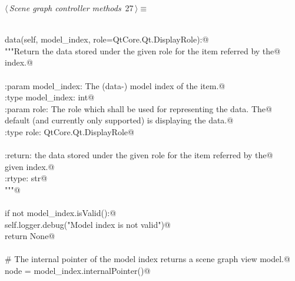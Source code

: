 \documentclass[
    a4paper,      %
    10pt,         %
    openright,    %
    notitlepage,  %
    parskip=half, %
]{scrreprt}       %
\theoremstyle{definition}                    %
\begin{document}
\begin{flushleft} \small
\begin{minipage}{\linewidth}\label{scrap26}\raggedright\small
{} $\langle\,${\itshape Scene graph controller methods}\nobreak\ {\footnotesize {27}}$\,\rangle\equiv$
\vspace{-1exm}
\begin{list}{}{} \item
\mbox{}\lstinline@@\\
\mbox{}\lstinline@def data(self, model_index, role=QtCore.Qt.DisplayRole):@\\
\mbox{}\lstinline@    """Return the data stored under the given role for the item referred by the@\\
\mbox{}\lstinline@    index.@\\
\mbox{}\lstinline@@\\
\mbox{}\lstinline@    :param model_index: The (data-) model index of the item.@\\
\mbox{}\lstinline@    :type model_index: int@\\
\mbox{}\lstinline@    :param role: The role which shall be used for representing the data. The@\\
\mbox{}\lstinline@                 default (and currently only supported) is displaying the data.@\\
\mbox{}\lstinline@    :type role:  QtCore.Qt.DisplayRole@\\
\mbox{}\lstinline@@\\
\mbox{}\lstinline@    :return: the data stored under the given role for the item referred by the@\\
\mbox{}\lstinline@             given index.@\\
\mbox{}\lstinline@    :rtype:  str@\\
\mbox{}\lstinline@    """@\\
\mbox{}\lstinline@@\\
\mbox{}\lstinline@    if not model_index.isValid():@\\
\mbox{}\lstinline@        self.logger.debug("Model index is not valid")@\\
\mbox{}\lstinline@        return None@\\
\mbox{}\lstinline@@\\
\mbox{}\lstinline@    # The internal pointer of the model index returns a scene graph view model.@\\
\mbox{}\lstinline@    node = model_index.internalPointer()@\\
\mbox{}\lstinline@@\\

\end{list}
\end{minipage}
\end{flushleft}
\end{document}
